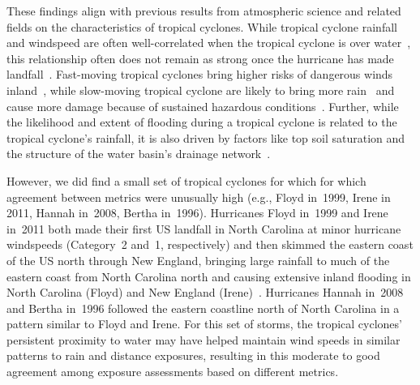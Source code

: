 These findings align with previous results from atmospheric science and related
fields on the characteristics of tropical cyclones. While tropical cyclone
rainfall and windspeed are often well-correlated when the tropical cyclone is
over water~\parencite{cerveny2000}, this relationship often does not remain as
strong once the hurricane has made landfall~\parencite{jiang2008}.  Fast-moving
tropical cyclones bring higher risks of dangerous winds
inland~\parencite{kruk2010}, while slow-moving tropical cyclone are likely to
bring more rain~\parencite{rappaport2000} and cause more damage because of
sustained hazardous conditions~\parencite{rezapour2014}. Further, while the
likelihood and extent of flooding during a tropical cyclone is related to the
tropical cyclone's rainfall, it is also driven by factors like top soil
saturation and the structure of the water basin's drainage
network~\parencite{chen2015, rees2001}. 

However, we did find a small set of tropical cyclones for which for which
agreement between metrics were unusually high (e.g., Floyd in~1999, Irene in
2011, Hannah in~2008, Bertha in~1996).  Hurricanes Floyd in~1999 and Irene
in~2011 both made their first \ac{US} landfall in North Carolina at minor
hurricane windspeeds (Category~2 and~1, respectively) and then skimmed the
eastern coast of the \ac{US} north through New England, bringing large rainfall
to much of the eastern coast from North Carolina north and causing extensive
inland flooding in North Carolina (Floyd) and New England
(Irene)~\parencite{avila2013atlantic, lawrence2000atlantic}.  Hurricanes Hannah
in~2008 and Bertha in~1996 followed the eastern coastline north of North
Carolina in a pattern similar to Floyd and Irene. For this set of storms, the
tropical cyclones' persistent proximity to water may have helped maintain wind
speeds in similar patterns to rain and distance exposures, resulting in this
moderate to good agreement among exposure assessments based on different
metrics. 

